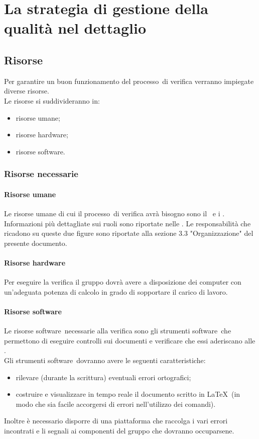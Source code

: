 \documentclass[../PianoDiQualifica.tex]{subfiles}
\begin{document}
\section{La strategia di gestione della qualità nel dettaglio}
		\subsection{Risorse}
		Per garantire un buon funzionamento del processo\g\ di verifica verranno impiegate diverse risorse.\\
		Le risorse si suddivideranno in:
		\begin{itemize}
			\item risorse umane;
			\item risorse hardware;
			\item risorse software\g.
		\end{itemize}
			\subsubsection{Risorse necessarie}
				\paragraph{Risorse umane}
				Le risorse umane di cui il processo\g\ di verifica avrà bisogno sono il \responsabilediprogetto\ e i \verificatori.
				Informazioni più dettagliate sui ruoli sono riportate nelle \normediprogettov. Le responsabilità che ricadono su queste due figure sono riportate alla sezione 3.3 "Organizzazione" del presente documento.
				\paragraph{Risorse hardware}
				Per eseguire la verifica il gruppo dovrà avere a disposizione dei computer con un'adeguata potenza di calcolo in grado di sopportare il carico di lavoro.		    
				\paragraph{Risorse software}
			    Le risorse software\g\ necessarie alla verifica sono gli strumenti software\g\ 
che permettono di eseguire controlli sui documenti e verificare che essi aderiscano alle \normediprogettov.\\
			    Gli strumenti software\g\ dovranno avere le seguenti caratteristiche:
			    \begin{itemize}
			    	\item rilevare (durante la scrittura) eventuali errori ortografici;
			    	\item costruire e visualizzare in tempo reale il documento scritto in \LaTeX\g\ (in modo che sia facile accorgersi di errori nell'utilizzo dei comandi).
			    \end{itemize}
			    Inoltre è necessario disporre di una piattaforma che raccolga i vari errori incontrati e li segnali ai componenti del gruppo che dovranno occuparsene. 
\end{document}
